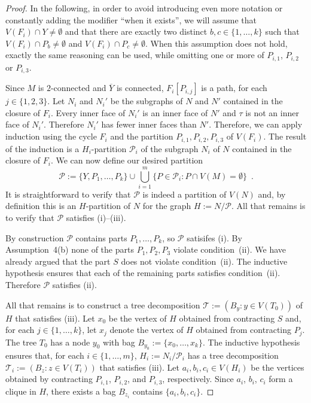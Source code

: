 \documentclass{patmorin}
\theoremstyle{plain}
\theoremstyle{definition}
\begin{document}
\begin{proof}
	In the following, in order to avoid introducing even more notation or constantly adding the modifier ``when it exists'', we will assume that $V(F_i)\cap Y\neq\emptyset$ and that there are exactly two distinct $b,c\in\{1,\ldots,k\}$ such that $V(F_i)\cap P_b\neq\emptyset$ and $V(F_i)\cap P_c\neq\emptyset$.  When this assumption does not hold, exactly the same reasoning can be used, while omitting one or more of $P_{i,1}$, $P_{i,2}$ or $P_{i,3}$.

	Since $M$ is $2$-connected and $\overline{Y}$ is connected, $F_i[P_{i,j}]$ is a path, for each $j\in\{1,2,3\}$.  Let $N_i$ and $N_i'$ be the subgraphs of $N$ and $N'$ contained in the closure of $F_i$.  Every inner face of $N_i'$ is an inner face of $N'$ and $\tau$ is not an inner face of $N_i'$.  Therefore $N_i'$ has fewer inner faces than $N'$.  Therefore, we can apply induction using the cycle $F_i$ and the partition $P_{i,1},P_{i,2},P_{i,3}$ of $V(F_i)$.  The result of the induction is a $H_i$-partition $\mathcal{P}_i$ of the subgraph $N_i$ of $N$ contained in the closure of $F_i$.
	We can now define our desired partition
	\[
	\mathcal{P}:=\{Y, P_1,\ldots,P_k\} \cup \bigcup_{i=1}^m \{P\in\mathcal{P}_i: P\cap V(M)=\emptyset\} \enspace .
	\]
	It is straightforward to verify that $\mathcal{P}$ is indeed a partition of $V(N)$ and, by definition this is an $H$-partition of $N$ for the graph $H:=N/\mathcal{P}$.  All that remains is to verify that $\mathcal{P}$ satisfies (i)--(iii).

	By construction $\mathcal{P}$ contains parts $P_1,\ldots,P_k$, so $\mathcal{P}$ satisifes (i).  By Assumption~4(b) none of the parts $P_1,P_2,P_3$ violate condition~(ii).  We have already argued that the part $S$ does not violate condition~(ii).  The inductive hypothesis ensures that each of the remaining parts satisfies condition~(ii).   Therefore $\mathcal{P}$ satisfies (ii).

	All that remains is to construct a tree decomposition $\mathcal{T}:=(B_y:y\in V(T_0))$ of $H$ that satisfies (iii). Let $x_0$ be the vertex of $H$ obtained from contracting $S$ and, for each $j\in\{1,\ldots,k\}$, let $x_j$ denote the vertex of $H$ obtained from contracting $P_j$.  The tree $T_0$ has a node $y_0$ with bag $B_{y_0}:=\{x_0,\ldots,x_k\}$. The inductive hypothesis ensures that, for each $i\in\{1,\ldots,m\}$,  $H_i:=N_i/\mathcal{P}_i$ has a tree decomposition $\mathcal{T}_i:=(B_z:z\in V(T_i))$ that satisfies (iii).  Let $a_i,b_i,c_i\in V(H_i)$ be the vertices obtained by contracting $P_{i,1}$, $P_{i,2}$, and $P_{i,3}$, respectively. Since $a_i$, $b_i$, $c_i$ form a clique in $H$, there exists a bag $B_{z_i}$ contains $\{a_i,b_i,c_i\}$.


\end{proof}
\end{document}

